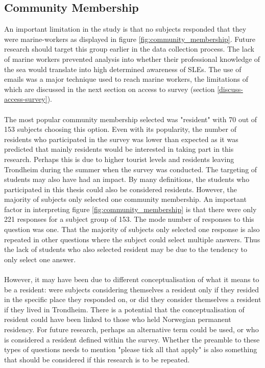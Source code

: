 \paragraph{}


\subsection{Community Membership}
An important limitation in the study is that no subjects responded that they were marine-workers as displayed in figure \ref{fig:community_membership}. Future research should target this group earlier in the data collection process. The lack of marine workers prevented analysis into whether their professional knowledge of the sea would translate into high determined awareness of SLEs. The use of emails was a major technique used to reach marine workers, the limitations of which are discussed in the next section on access to survey (section \ref{discuss-access-survey}). 

\paragraph{}
The most popular community membership selected was "resident" with 70 out of 153 subjects choosing this option. Even with its popularity, the number of residents who participated in the survey was lower than expected as it was predicted that mainly residents would be interested in taking part in this research. 
Perhaps this is due to higher tourist levels and residents leaving Trondheim during the summer when the survey was conducted. The targeting of students may also have had an impact. By many definitions, the students who participated in this thesis could also be considered residents. However, the majority of subjects only selected one community membership. An important factor in interpreting figure \ref{fig:community_membership} is that there were only 221 responses for a subject group of 153. The mode number of responses to this question was one. That the majority of subjects only selected one response is also repeated in other questions where the subject could select multiple answers. Thus the lack of students who also selected resident may be due to the tendency to only select one answer. 
\paragraph{}

However, it may have been due to different conceptualisation of what it means to be a resident: were subjects considering themselves a resident only if they resided in the specific place they responded on, or did they consider themselves a resident if they lived in Trondheim. There is a potential that the conceptualisation of resident could have been linked to those who held Norwegian permanent residency. For future research, perhaps an alternative term could be used, or who is considered a resident defined within the survey. Whether the preamble to these types of questions needs to mention "please tick all that apply" is also something that should be considered if this research is to be repeated. 
